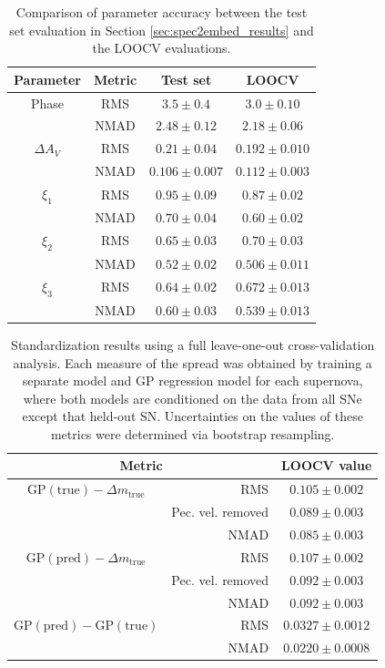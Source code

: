 \begin{table}[htbp]
    \centering
    \begin{tabular}{cccc}\toprule
        Parameter & Metric & Test set & LOOCV \\\midrule
        Phase & RMS & $3.5 \pm 0.4$ & $3.0 \pm 0.10$ \\
        & NMAD & $2.48 \pm 0.12$ & $2.18 \pm 0.06$\\
        $\Delta A_V$ & RMS & $0.21 \pm 0.04$ & $0.192 \pm 0.010$ \\
        & NMAD & $0.106 \pm 0.007$ & $0.112 \pm 0.003$\\
        $\xi_1$ & RMS & $0.95 \pm 0.09$ & $0.87 \pm 0.02$ \\
        & NMAD & $0.70 \pm 0.04$ & $0.60 \pm 0.02$\\
        $\xi_2$ & RMS & $0.65 \pm 0.03$ & $0.70 \pm 0.03$ \\
        & NMAD & $0.52 \pm 0.02$ & $0.506 \pm 0.011$\\
        $\xi_3$ & RMS & $0.64 \pm 0.02$ & $0.672 \pm 0.013$ \\
        & NMAD & $0.60 \pm 0.03$ & $0.539 \pm 0.013$\\
        \bottomrule
    \end{tabular}
    \caption{Comparison of parameter accuracy between the test set evaluation in Section \ref{sec:spec2embed_results} and the LOOCV evaluations.}
    \label{tab:loocv_comparison}
\end{table}

\begin{table}[htbp]
    \centering
    \begin{tabular}{crc}\toprule
        \multicolumn{2}{c}{Metric} & LOOCV value \\\midrule
        $\textrm{GP}(\textrm{true}) - \Delta m_\textrm{true}$ & RMS & $0.105 \pm 0.002$ \\
        & Pec. vel. removed & $0.089 \pm 0.003$\\
        & NMAD & $0.085 \pm 0.003$ \\
        $\textrm{GP}(\textrm{pred}) - \Delta m_\textrm{true}$ & RMS & $0.107 \pm 0.002$ \\
        & Pec. vel. removed & $0.092 \pm 0.003$ \\
        & NMAD & $0.092 \pm 0.003$\\
        $\textrm{GP}(\textrm{pred}) - \textrm{GP}(\textrm{true})$ & RMS & $0.0327\pm 0.0012$\\
        & NMAD & $0.0220 \pm 0.0008$\\
    \bottomrule
    \end{tabular}
    \caption{Standardization results using a full leave-one-out cross-validation analysis. Each measure of the spread was obtained by training a separate \stoe{} model and GP regression model for each supernova, where both models are conditioned on the data from all SNe except that held-out SN. Uncertainties on the values of these metrics were determined via bootstrap resampling.}
    \label{tab:standardization_loo_results}
\end{table}

